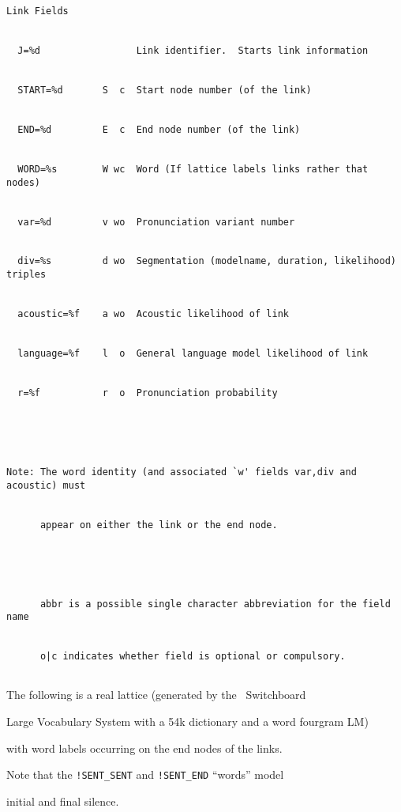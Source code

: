 \begin{verbatim}
Link Fields


  J=%d                 Link identifier.  Starts link information


  START=%d       S  c  Start node number (of the link)


  END=%d         E  c  End node number (of the link)


  WORD=%s        W wc  Word (If lattice labels links rather that nodes)


  var=%d         v wo  Pronunciation variant number


  div=%s         d wo  Segmentation (modelname, duration, likelihood) triples


  acoustic=%f    a wo  Acoustic likelihood of link


  language=%f    l  o  General language model likelihood of link


  r=%f           r  o  Pronunciation probability





Note: The word identity (and associated `w' fields var,div and acoustic) must


      appear on either the link or the end node.





      abbr is a possible single character abbreviation for the field name


      o|c indicates whether field is optional or compulsory.


\end{verbatim}















The following is a real lattice (generated by the \HTK\ Switchboard


Large Vocabulary System with a 54k dictionary and a word fourgram LM)


with word labels occurring on the end nodes of the links.





Note that the \verb|!SENT_SENT| and \verb|!SENT_END| ``words'' model


initial and final silence.





